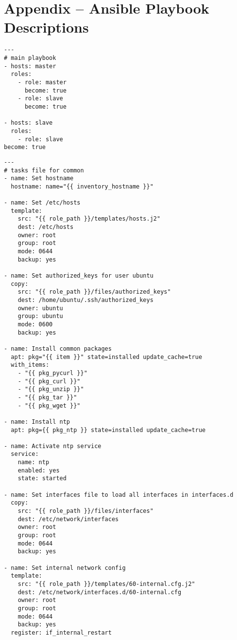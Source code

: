 
\chapter{Appendix -- Ansible Playbook Descriptions}
\label{app:ansible}

\lstset{language=sh}
\begin{lstlisting}[caption={Ansible playbook that gets run to install the cluster system}, label={lst:ansibleall}]
---
# main playbook
- hosts: master
  roles:
    - role: master
      become: true
    - role: slave
      become: true

- hosts: slave
  roles:
    - role: slave
become: true
\end{lstlisting}

\lstset{language=sh}
\begin{lstlisting}[caption={Common tasks in Ansible}, label={lst:ansiblecommon}]
---
# tasks file for common
- name: Set hostname
  hostname: name="{{ inventory_hostname }}"

- name: Set /etc/hosts
  template:
    src: "{{ role_path }}/templates/hosts.j2"
    dest: /etc/hosts
    owner: root
    group: root
    mode: 0644
    backup: yes

- name: Set authorized_keys for user ubuntu
  copy:
    src: "{{ role_path }}/files/authorized_keys"
    dest: /home/ubuntu/.ssh/authorized_keys
    owner: ubuntu
    group: ubuntu
    mode: 0600
    backup: yes

- name: Install common packages
  apt: pkg="{{ item }}" state=installed update_cache=true
  with_items:
    - "{{ pkg_pycurl }}"
    - "{{ pkg_curl }}"
    - "{{ pkg_unzip }}"
    - "{{ pkg_tar }}"
    - "{{ pkg_wget }}"

- name: Install ntp
  apt: pkg={{ pkg_ntp }} state=installed update_cache=true

- name: Activate ntp service
  service:
    name: ntp
    enabled: yes
    state: started

- name: Set interfaces file to load all interfaces in interfaces.d
  copy:
    src: "{{ role_path }}/files/interfaces"
    dest: /etc/network/interfaces
    owner: root
    group: root
    mode: 0644
    backup: yes

- name: Set internal network config
  template:
    src: "{{ role_path }}/templates/60-internal.cfg.j2"
    dest: /etc/network/interfaces.d/60-internal.cfg
    owner: root
    group: root
    mode: 0644
    backup: yes
  register: if_internal_restart


\end{lstlisting}
